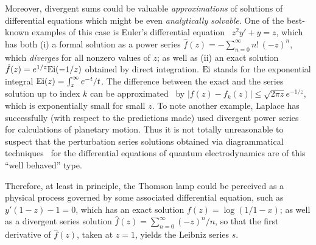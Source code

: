 \documentclass{llncs}
\begin{document}
Moreover, divergent sums could be valuable {\em approximations} of solutions of differential equations
which might be even {\em analytically solvable}.
One of the best-known examples of this case is Euler's differential equation~\cite{balser-2000,rousseau-2004,Costin-2009}
$z^2y'+y=z$, which has both (i) a formal solution as a power series ${\hat{f}}(z)=-\sum_{n=0}^\infty n!\,(-z)^n$,
which {\em diverges} for all nonzero values of $z$;
as well as (ii) an exact solution
${\hat{f}}(z) =e^{1/z}{\rm Ei}(-1/z)$ obtained by direct integration.
${\rm Ei}$ stands for the exponential integral ${\rm Ei}(z)=\int_{z}^\infty e^{-t}/t$.
The difference between the exact and the series solution up to index $k$ can be approximated~\cite{rousseau-2004} by
$\vert  f(z)-f_k(z)\vert \le \sqrt{2\pi z}e^{-1/z}$, which is exponentially small for small $z$.
To note another example, Laplace has successfully (with respect to the predictions made) used divergent
power series for calculations of planetary motion.
Thus it is not totally unreasonable to suspect that the perturbation series solutions obtained via diagrammatical
techniques~\cite{Itzykson-zuber,lurie,thooft-Veltman_Diagrammar}
for the differential equations of quantum electrodynamics are of this ``well behaved'' type.

Therefore,  at least in principle, the Thomson lamp could be perceived as a physical process governed by some associated differential equation,
such as $y'(1-z)-1=0$, which has an exact solution $f(z)=\log (1/1-x)$; as well as a divergent series solution  ${\hat{f}}(z)=\sum_{n=0}^\infty (-z)^n/n$,
so that the first derivative of ${\hat{f}}(z)$, taken at $z=1$, yields the Leibniz series $s$.
\end{document}
